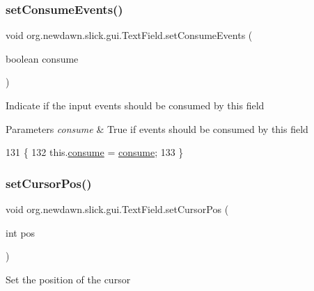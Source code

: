 \subsubsection{\texorpdfstring{set\+Consume\+Events()}{setConsumeEvents()}}
{\footnotesize\ttfamily void org.\+newdawn.\+slick.\+gui.\+Text\+Field.\+set\+Consume\+Events (\begin{DoxyParamCaption}\item[{boolean}]{consume }\end{DoxyParamCaption})\hspace{0.3cm}{\ttfamily [inline]}}

Indicate if the input events should be consumed by this field


\begin{DoxyParams}{Parameters}
{\em consume} & True if events should be consumed by this field \\
\hline
\end{DoxyParams}

\begin{DoxyCode}
131                                                   \{
132         this.\mbox{\hyperlink{classorg_1_1newdawn_1_1slick_1_1gui_1_1_text_field_a6e09e0dd0d37b70c964a29f949a4c7f9}{consume}} = \mbox{\hyperlink{classorg_1_1newdawn_1_1slick_1_1gui_1_1_text_field_a6e09e0dd0d37b70c964a29f949a4c7f9}{consume}};
133     \}
\end{DoxyCode}
\mbox{\label{classorg_1_1newdawn_1_1slick_1_1gui_1_1_text_field_a786d3eeca6b5574c561bab7492812010}} 
\subsubsection{\texorpdfstring{set\+Cursor\+Pos()}{setCursorPos()}}
{\footnotesize\ttfamily void org.\+newdawn.\+slick.\+gui.\+Text\+Field.\+set\+Cursor\+Pos (\begin{DoxyParamCaption}\item[{int}]{pos }\end{DoxyParamCaption})\hspace{0.3cm}{\ttfamily [inline]}}

Set the position of the cursor


